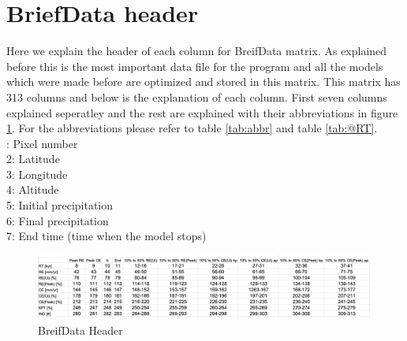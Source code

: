 \documentclass[11pt,a4paper,titlepage]{report}
\begin{document}
\section{BriefData header}
Here we explain the header of each column for BreifData matrix. As explained before this is the most important data file for the program and all the models which were made before are optimized and stored in this matrix. This matrix has 313 columns and below is the explanation of each column. First seven columns explained seperatley and the rest are explained with their abbreviations in figure \ref{fig:header}. For the abbreviations please refer to table \ref{tab:abbr} and table \ref{tab:@RT}.\\
: Pixel number\\
2: Latitude\\
3: Longitude\\
4: Altitude\\
5: Initial precipitation\\
6: Final precipitation\\
7: End time (time when the model stops)\\

\begin{figure}[H]
    \centering
    \includegraphics[width=1\textwidth]{header.png}
    \caption[BreifData Header]{BreifData Header}
    \label{fig:header}    
\end{figure}
\end{document}
